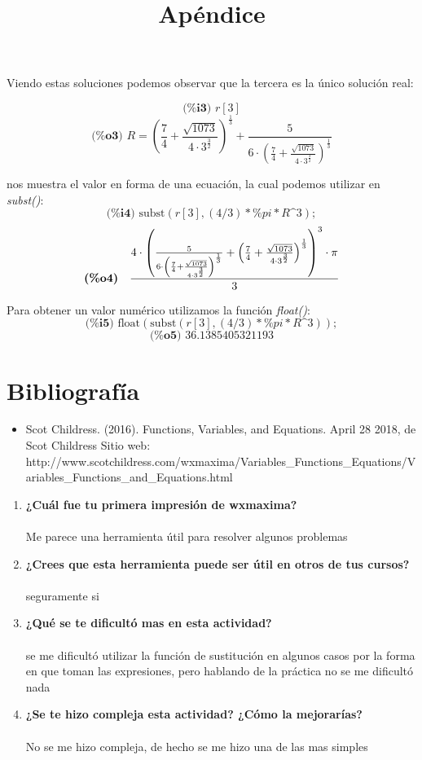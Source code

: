 \documentclass{article}
\begin{document}
Viendo estas soluciones podemos observar que la tercera es la único solución real:

\[ \textbf{(\%i3) }r[3] \]
\[ \textbf{(\%o3) }R={{\left( \frac{7}{4}+\frac{\sqrt{1073}}{4\cdot {{3}^{\frac{3}{2}}}}\right) }^{\frac{1}{3}}}+\frac{5}{6\cdot {{\left( \frac{7}{4}+\frac{\sqrt{1073}}{4\cdot {{3}^{\frac{3}{2}}}}\right) }^{\frac{1}{3}}}} \]

nos muestra el valor en forma de una ecuación, la cual podemos utilizar en \textit{subst()}:
\[ \textbf{(\%i4) }\text{subst}(r[3],(4/3)*\%pi*R\text{\textasciicircum}3); \]
\[ \mathrm{\tt \textbf{(\%o4)} }\quad \frac{4\cdot {{\left( \frac{5}{6\cdot {{\left( \frac{7}{4}+\frac{\sqrt{1073}}{4\cdot {{3}^{\frac{3}{2}}}}\right) }^{\frac{1}{3}}}}+{{\left( \frac{7}{4}+\frac{\sqrt{1073}}{4\cdot {{3}^{\frac{3}{2}}}}\right) }^{\frac{1}{3}}}\right) }^{3}}\cdot \pi }{3} \]

Para obtener un valor numérico utilizamos la función \textit{float()}:
\[ \textbf{(\%i5) }\text{float}(\text{subst}(r[3],(4/3)*\%pi*R\text{\textasciicircum}3)); \]
\[ \textbf{(\%o5) }36.1385405321193 \]

\newpage

\section{Bibliografía}
\begin{itemize}
\item Scot Childress. (2016). Functions, Variables, and Equations. April 28 2018, de Scot Childress Sitio web: http://www.scotchildress.com/wxmaxima/Variables\_Functions\_Equations/Variables\_Functions\_and\_Equations.html
\end{itemize}

\newpage

\title{Apéndice}

\begin{enumerate}
\item \textbf{¿Cuál fue tu primera impresión de wxmaxima?} ~\\~\\
Me parece una herramienta útil para resolver algunos problemas

\item \textbf{¿Crees que esta herramienta puede ser útil en otros de tus cursos?}~\\~\\
seguramente si

\item \textbf{¿Qué se te dificultó mas en esta actividad?}~\\~\\
se me dificultó utilizar la función de sustitución en algunos casos por la forma en que toman las expresiones, pero hablando de la práctica no se me dificultó nada

\item \textbf{¿Se te hizo compleja esta actividad? ¿Cómo la mejorarías? }~\\~\\
No se me hizo compleja, de hecho se me hizo una de las mas simples

\end{enumerate}
\end{document}
